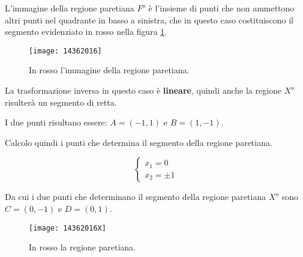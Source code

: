 \documentclass[\main/main.tex]{subfiles}
\begin{document}
L'immagine della regione paretiana $F^o$ è l'insieme di punti che non ammettono altri punti nel quadrante in basso a sinistra, che in questo caso costituiscono il segmento evidenziato in rosso nella figura \ref{area_paretiana_3}.

\begin{figure}
	\texttt{[image: 14362016]}
	\caption{In rosso l'immagine della regione paretiana.}
	\label{area_paretiana_3}
\end{figure}

La trasformazione inversa in questo caso è \textbf{lineare}, quindi anche la regione $X^o$ risulterà un segmento di retta.

I due punti risultano essere: $A = (-1, 1)$ e $B = (1,-1)$.

Calcolo quindi i punti che determina il segmento della regione paretiana.

\[
	\begin{cases}
		x_1  = 0 \\
		x_2  = \pm1
	\end{cases}
\]

Da cui i due punti che determinano il segmento della regione paretiana $X^o$ sono $C = (0, -1)$ e $D = (0, 1)$.

\begin{figure}
	\texttt{[image: 14362016X]}
	\caption{In rosso la regione paretiana.}
	\label{area_paretiana_4}
\end{figure}
\end{document}
